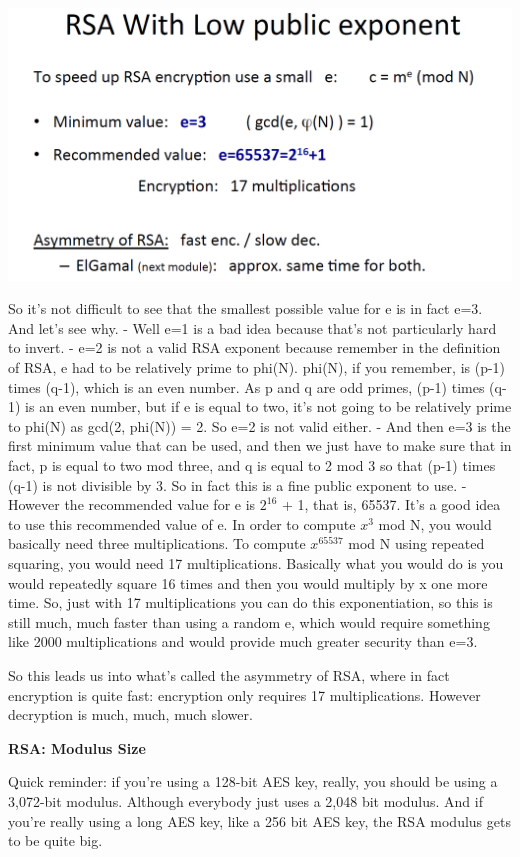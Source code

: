 \documentclass[11pt]{article}
\makeatletter
\def\maxwidth{\ifdim\Gin@nat@width>\linewidth\linewidth
    \else\Gin@nat@width\fi}
\let\Oldincludegraphics\includegraphics
\renewcommand{\includegraphics}[1]{\Oldincludegraphics[width=.8\maxwidth]{#1}}
\makeatother
\begin{document}
\includegraphics{./Images/RSASpeedUp.png}

So it's not difficult to see that the smallest possible value for e is
in fact e=3. And let's see why. - Well e=1 is a bad idea because that's
not particularly hard to invert. - e=2 is not a valid RSA exponent
because remember in the definition of RSA, e had to be relatively prime
to phi(N). phi(N), if you remember, is (p-1) times (q-1), which is an
even number. As p and q are odd primes, (p-1) times (q-1) is an even
number, but if e is equal to two, it's not going to be relatively prime
to phi(N) as gcd(2, phi(N)) = 2. So e=2 is not valid either. - And then
e=3 is the first minimum value that can be used, and then we just have
to make sure that in fact, p is equal to two mod three, and q is equal
to 2 mod 3 so that (p-1) times (q-1) is not divisible by 3. So in fact
this is a fine public exponent to use. - However the recommended value
for e is \(2^{16}\) + 1, that is, 65537. It's a good idea to use this
recommended value of e. In order to compute \(x^{3}\) mod N, you would
basically need three multiplications. To compute \(x^{65537}\) mod N
using repeated squaring, you would need 17 multiplications. Basically
what you would do is you would repeatedly square 16 times and then you
would multiply by x one more time. So, just with 17 multiplications you
can do this exponentiation, so this is still much, much faster than
using a random e, which would require something like 2000
multiplications and would provide much greater security than e=3.

So this leads us into what's called the asymmetry of RSA, where in fact
encryption is quite fast: encryption only requires 17 multiplications.
However decryption is much, much, much slower.

\textbf{RSA: Modulus Size}

Quick reminder: if you're using a 128-bit AES key, really, you should be
using a 3,072-bit modulus. Although everybody just uses a 2,048 bit
modulus. And if you're really using a long AES key, like a 256 bit AES
key, the RSA modulus gets to be quite big.
\end{document}
